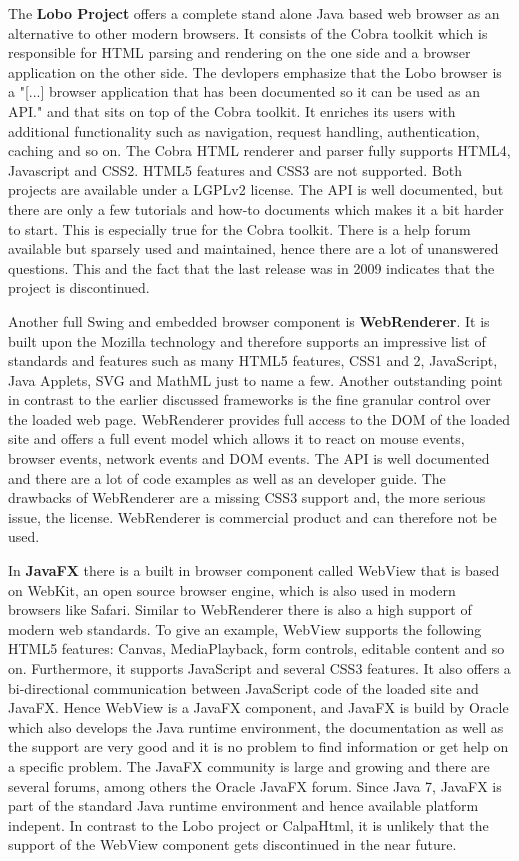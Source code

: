 
The \textbf{Lobo Project} offers a complete stand alone Java based web browser as an alternative to other modern browsers.
It consists of the Cobra toolkit which is responsible for HTML parsing and rendering on the one side and a browser application on the other side.
The devlopers emphasize that the Lobo browser is a "[...]  browser application that has been documented so it can be used as an API." \autocite{tech-ana:lobo} and that sits on top of the Cobra toolkit.
It enriches its users with additional functionality such as navigation, request handling, authentication, caching and so on.
The Cobra HTML renderer and parser fully supports HTML4, Javascript and CSS2.
HTML5 features and CSS3 are not supported.
Both projects are available under a LGPLv2 license.
The API is well documented, but there are only a few tutorials and how-to documents which makes it a bit harder to start.
This is especially true for the Cobra toolkit.
There is a help forum available but sparsely used and maintained, hence there are a lot of unanswered questions.
This and the fact that the last release was in 2009 indicates that the project is discontinued.

Another full Swing and embedded browser component is \textbf{WebRenderer}.
It is built upon the Mozilla technology and therefore supports an impressive list of standards and features such as many HTML5 features, CSS1 and 2, JavaScript, Java Applets, SVG and MathML just to name a few.
Another outstanding point in contrast to the earlier discussed frameworks is the fine granular control over the loaded web page.
WebRenderer provides full access to the DOM of the loaded site and offers a full event model which allows it to react on mouse events, browser events, network events and DOM events.
The API is well documented and there are a lot of code examples as well as an developer guide.
The drawbacks of WebRenderer are a missing CSS3 support and, the more serious issue, the license.
WebRenderer is commercial product and can therefore not be used.

In \textbf{JavaFX} there is a built in browser component called WebView that is based on WebKit, an open source browser engine, which is also used in modern browsers like Safari.
Similar to WebRenderer there is also a high support of modern web standards.
To give an example, WebView supports the following HTML5 features: Canvas, MediaPlayback, form controls, editable content and so on.
Furthermore, it supports JavaScript and several CSS3 features.
It also offers a bi-directional communication between JavaScript code of the loaded site and JavaFX.
Hence WebView is a JavaFX component, and JavaFX is build by Oracle which also develops the Java runtime environment, the documentation as well as the support are very good and it is no problem to find information or get help on a specific problem.
The JavaFX community is large and growing and there are several forums, among others the Oracle JavaFX forum.
Since Java 7, JavaFX is part of the standard Java runtime environment and hence available platform indepent.
In contrast to the Lobo project or CalpaHtml, it is unlikely that the support of the WebView component gets discontinued in the near future.


